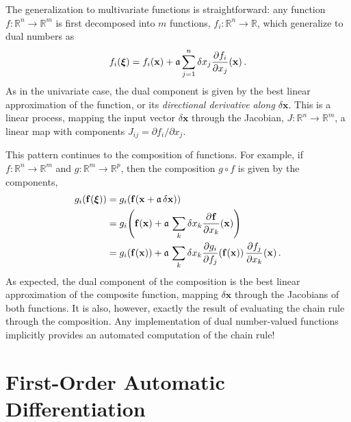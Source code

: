 The generalization to multivariate functions is straightforward: any function 
$f : \mathbb{R}^{n} \rightarrow \mathbb{R}^{m}$ is first decomposed into $m$
functions, $f_{i} : \mathbb{R}^{n} \rightarrow \mathbb{R}$, which generalize
to dual numbers as
%
\begin{equation} \label{dualFunction}
f_{i} \! \left( \mbox{\boldmath{$\xi$}} \right) = f_{i} \! \left( \mathbf{x} \right) 
+ \mathfrak{a} \sum_{j = 1}^{n} 
\delta x_{j} \frac{ \partial f_{i} }{ \partial x_{j} } \! \left( \mathbf{x} \right).
\end{equation}
%
As in the univariate case, the dual component is given by the best linear approximation 
of the function, or its \textit{directional derivative along $\delta \mathbf{x}$}.  This is a
linear process, mapping the input vector $\delta \mathbf{x}$ through the Jacobian, 
$J : \mathbb{R}^{n} \rightarrow \mathbb{R}^{m}$, a linear map with components
$J_{ij} = \partial f_{i} / \partial x_{j}$.

This pattern continues to the composition of functions.  For example, if 
$f : \mathbb{R}^{n} \rightarrow \mathbb{R}^{m}$ and 
$g : \mathbb{R}^{m} \rightarrow \mathbb{R}^{p}$, then the composition $g \circ f$
is given by the components,
%
\begin{align*}
g_{i} \! \left( \mathbf{f} \! \left( \mbox{\boldmath{$\xi$}} \right) \right)
&= 
g_{i} \! \left( \mathbf{f} \! \left( \mathbf{x} + \mathfrak{a} \, \delta \mathbf{x} \right) \right)
\\
&=
g_{i} \! \left( \mathbf{f} \! \left( \mathbf{x} \right) 
+ \mathfrak{a} \, \sum_{k} \delta x_{k} 
\frac{ \partial \mspace{1mu} \mathbf{f} }{ \partial x_{k} } \! \left( \mathbf{x} \right) \right)
\\
&=
g_{i} \! \left( \mathbf{f} \! \left( \mathbf{x} \right) \right)
+ \mathfrak{a} \, \sum_{k} \delta x_{k} 
\frac{ \partial g_{i} }{ \partial f_{j} }  \! \left( \mathbf{f} \! \left( \mathbf{x} \right) \right)
\frac{ \partial f_{j} }{ \partial x_{k} } \! \left( \mathbf{x} \right).
\end{align*}
%
As expected, the dual component of the composition is the best linear approximation
of the composite function, mapping $\delta \mathbf{x}$ through the Jacobians of both
functions.  It is also, however, exactly the result of evaluating the chain rule through
the composition.  Any implementation of dual number-valued functions implicitly provides 
an automated computation of the chain rule!

\section{First-Order Automatic Differentiation}

